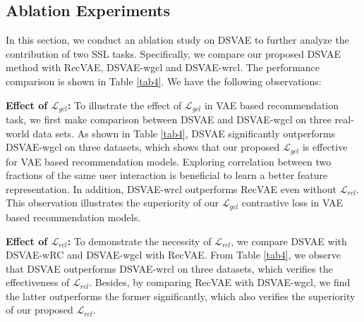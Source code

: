 \subsection{Ablation Experiments}\label{subsec2}
In this section, we conduct an ablation study on DSVAE to further analyze the contribution of two SSL tasks. 
Specifically, we compare our proposed DSVAE method with RecVAE, DSVAE-wgcl and DSVAE-wrcl. The performance comparison is shown in Table \ref{tab4}. We have the following observations:


\textbf{Effect of $\mathcal{L}_{gcl}$:} To illustrate the effect of $\mathcal{L}_{gcl}$ in VAE based recommendation task, we first make comparison between DSVAE and DSVAE-wgcl on three real-world data sets. As shown in Table \ref{tab4}, DSVAE significantly outperforms DSVAE-wgcl on three datasets, which shows that our proposed $\mathcal{L}_{gcl}$ is effective for VAE based recommendation models. Exploring correlation between two fractions of the same user interaction is beneficial to learn a better feature representation. In addition, DSVAE-wrcl outperforms RecVAE even without $\mathcal{L}_{rcl}$. This observation illustrates the superiority of our $\mathcal{L}_{gcl}$ contrastive loss in VAE based recommendation models.

\textbf{Effect of $\mathcal{L}_{rcl}$:} To demonstrate the necessity of $\mathcal{L}_{rcl}$, we compare DSVAE with DSVAE-wRC and DSVAE-wgcl with RecVAE. From Table \ref{tab4}, we observe that DSVAE outperforms DSVAE-wrcl on three datasets, which verifies the effectiveness of $\mathcal{L}_{rcl}$. Besides, by comparing RecVAE with DSVAE-wgcl, we find the latter outperforms the former significantly, which also verifies the superiority of our proposed $\mathcal{L}_{rcl}$.



